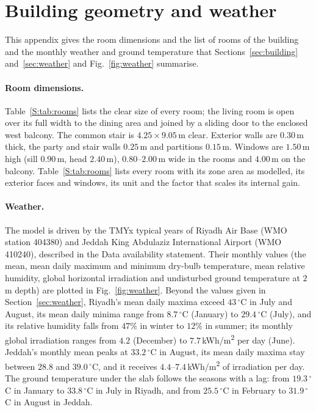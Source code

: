 \documentclass[10pt,a4paper,twocolumn]{article}
\theoremstyle{definition}
\begin{document}
\section{Building geometry and weather}\label{S:geometry}\label{app:S3}
This appendix gives the room dimensions and the list of rooms of the building and the monthly weather and ground temperature that Sections~\ref{sec:building} and~\ref{sec:weather} and Fig.~\ref{fig:weather} summarise.

\paragraph{Room dimensions.} Table~\ref{S:tab:rooms} lists the clear size of every room; the living room is open over its full width to the dining area and joined by a sliding door to the enclosed west balcony. The common stair is $4.25\times9.05\,$m clear. Exterior walls are $0.30\,$m thick, the party and stair walls $0.25\,$m and partitions $0.15\,$m. Windows are $1.50\,$m high (sill $0.90\,$m, head $2.40\,$m), $0.80$--$2.00\,$m wide in the rooms and $4.00\,$m on the balcony. Table~\ref{S:tab:rooms} lists every room with its zone area as modelled, its exterior faces and windows, its unit and the factor that scales its internal gain.


\paragraph{Weather.} The model is driven by the TMYx typical years of Riyadh Air Base (WMO station 404380) and Jeddah King Abdulaziz International Airport (WMO 410240), described in the Data availability statement. Their monthly values (the mean, mean daily maximum and minimum dry-bulb temperature, mean relative humidity, global horizontal irradiation and undisturbed ground temperature at $2\,$m depth) are plotted in Fig.~\ref{fig:weather}. Beyond the values given in Section~\ref{sec:weather}, Riyadh's mean daily maxima exceed $43\,^{\circ}$C in July and August, its mean daily minima range from $8.7\,^{\circ}$C (January) to $29.4\,^{\circ}$C (July), and its relative humidity falls from $47\%$ in winter to $12\%$ in summer; its monthly global irradiation ranges from $4.2$ (December) to $7.7\,$kWh/m\textsuperscript{2} per day (June). Jeddah's monthly mean peaks at $33.2\,^{\circ}$C in August, its mean daily maxima stay between $28.8$ and $39.0\,^{\circ}$C, and it receives $4.4$--$7.4\,$kWh/m\textsuperscript{2} of irradiation per day. The ground temperature under the slab follows the seasons with a lag: from $19.3\,^{\circ}$C in January to $33.8\,^{\circ}$C in July in Riyadh, and from $25.5\,^{\circ}$C in February to $31.9\,^{\circ}$C in August in Jeddah.
\end{document}
